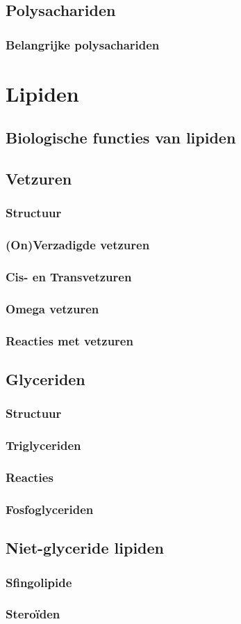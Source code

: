 \documentclass[a4paper,kul]{kulakarticle} %
\begin{document}
\subsection{Polysachariden}
\subsubsection{Belangrijke polysachariden}
\section{Lipiden}
\subsection{Biologische functies van lipiden}
\subsection{Vetzuren}
\subsubsection{Structuur}
\subsubsection{(On)Verzadigde vetzuren}
\subsubsection{Cis- en Transvetzuren}
\subsubsection{Omega vetzuren}
\subsubsection{Reacties met vetzuren}
\subsection{Glyceriden}
\subsubsection{Structuur}
\subsubsection{Triglyceriden}
\subsubsection{Reacties}
\subsubsection{Fosfoglyceriden}
\subsection{Niet-glyceride lipiden}
\subsubsection{Sfingolipide}
\subsubsection{Steroïden}
\end{document}
